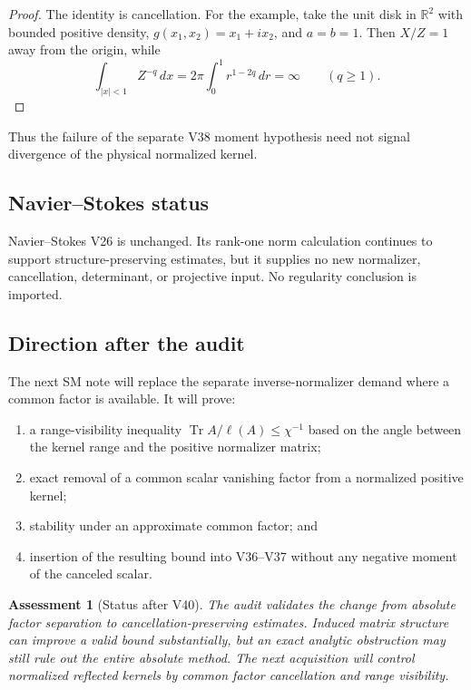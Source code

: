 \documentclass[11pt]{article}
\newtheorem{assessment}[theorem]{Assessment}
\theoremstyle{remark}
\begin{document}
\begin{proof}
The identity is cancellation.  For the example, take the unit disk
in \(\mathbb R^2\) with bounded positive density,
\(g(x_1,x_2)=x_1+ix_2\), and \(a=b=1\).  Then \(X/Z=1\) away from
the origin, while
\[
 \int_{|x|<1}Z^{-q}\,dx
 =
 2\pi\int_0^1r^{1-2q}\,dr
 =
 \infty
 \qquad(q\geq1).
\]
\end{proof}

Thus the failure of the separate V38 moment hypothesis need not
signal divergence of the physical normalized kernel.

\subsection{Navier--Stokes status}

Navier--Stokes V26 is unchanged.  Its rank-one norm calculation
continues to support structure-preserving estimates, but it supplies
no new normalizer, cancellation, determinant, or projective input.
No regularity conclusion is imported.

\subsection{Direction after the audit}

The next SM note will replace the separate inverse-normalizer demand
where a common factor is available.  It will prove:

\begin{enumerate}
\item a range-visibility inequality
\(\operatorname{Tr}A/\ell(A)\leq\chi^{-1}\) based on the angle between
the kernel range and the positive normalizer matrix;
\item exact removal of a common scalar vanishing factor from a
normalized positive kernel;
\item stability under an approximate common factor; and
\item insertion of the resulting bound into V36--V37 without any
negative moment of the canceled scalar.
\end{enumerate}

\begin{assessment}[Status after V40]
\label{ass:v12v40-status}
The audit validates the change from absolute factor separation to
cancellation-preserving estimates.  Induced matrix structure can
improve a valid bound substantially, but an exact analytic
obstruction may still rule out the entire absolute method.  The
next acquisition will control normalized reflected kernels by common
factor cancellation and range visibility.
\end{assessment}
\end{document}
